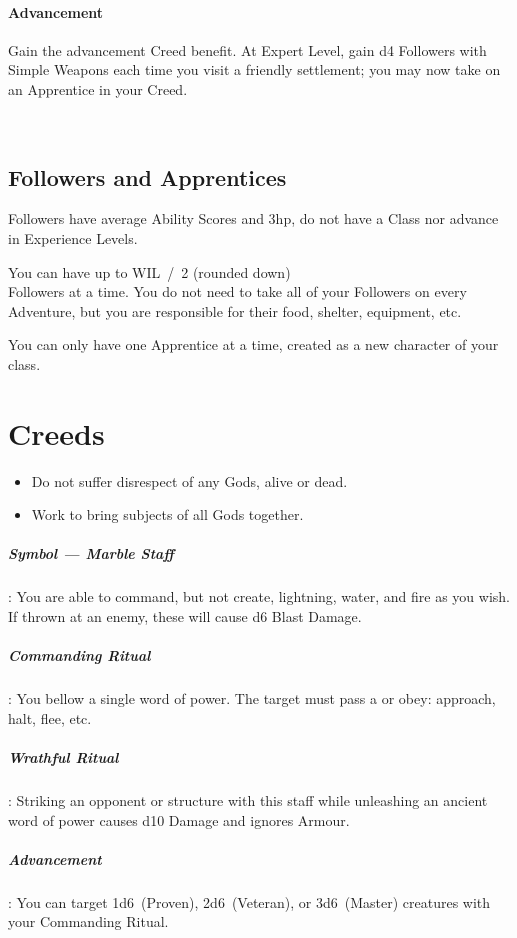 \documentclass[itdr]{subfiles}
\begin{document}
\paragraph{Advancement}
Gain the advancement Creed benefit. At Expert Level, gain d4 Followers with Simple Weapons each time you visit a friendly settlement; you may now take on an Apprentice in your Creed.

\vfill
{}
~\\

\subsection{Followers and Apprentices}
Followers have average Ability Scores and 3hp, do not have a Class nor advance in Experience Levels.

You can have up to WIL~/~2 (rounded down)\\Followers at a time. You do not need to take all of your Followers on every Adventure, but you are responsible for their food, shelter, equipment, etc.

You can only have one Apprentice at a time, created as a new character of your class.

\break

\section{Creeds}

{\em\begin{itemize}
		\item Do not suffer disrespect of any Gods, alive or dead.
		\item Work to bring subjects of all Gods together.
\end{itemize}}

\subparagraph{Symbol --- Marble Staff}: You are able to command, but not create, lightning, water, and fire as you wish. If thrown at an enemy, these will cause d6 Blast Damage.

\subparagraph{Commanding Ritual}: You bellow a single word of power. The target must pass a  or obey: approach, halt, flee, etc.

\subparagraph{Wrathful Ritual}: Striking an opponent or structure with this staff while unleashing an ancient word of power causes d10 Damage and ignores Armour.

\subparagraph{Advancement}: You can target 1d6~(Proven), 2d6~(Veteran), or 3d6~(Master) creatures with your Commanding Ritual.
\end{document}
